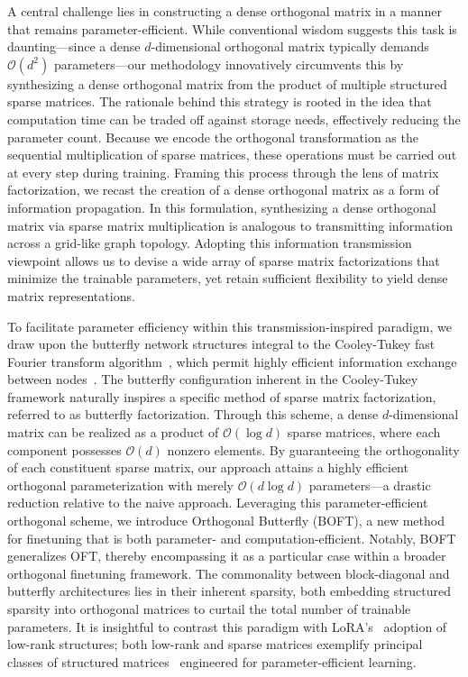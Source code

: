 A central challenge lies in constructing a dense orthogonal matrix in a manner that remains parameter-efficient. While conventional wisdom suggests this task is daunting—since a dense $d$-dimensional orthogonal matrix typically demands $\mathcal{O}(d^2)$ parameters—our methodology innovatively circumvents this by synthesizing a dense orthogonal matrix from the product of multiple structured sparse matrices. The rationale behind this strategy is rooted in the idea that computation time can be traded off against storage needs, effectively reducing the parameter count. Because we encode the orthogonal transformation as the sequential multiplication of sparse matrices, these operations must be carried out at every step during training. Framing this process through the lens of matrix factorization, we recast the creation of a dense orthogonal matrix as a form of information propagation. In this formulation, synthesizing a dense orthogonal matrix via sparse matrix multiplication is analogous to transmitting information across a grid-like graph topology. Adopting this information transmission viewpoint allows us to devise a wide array of sparse matrix factorizations that minimize the trainable parameters, yet retain sufficient flexibility to yield dense matrix representations.

To facilitate parameter efficiency within this transmission-inspired paradigm, we draw upon the butterfly network structures integral to the Cooley-Tukey fast Fourier transform algorithm~\cite{cooley1965algorithm}, which permit highly efficient information exchange between nodes~\cite{klasing1994broadcasting}. The butterfly configuration inherent in the Cooley-Tukey framework naturally inspires a specific method of sparse matrix factorization, referred to as butterfly factorization. Through this scheme, a dense $d$-dimensional matrix can be realized as a product of $\mathcal{O}(\log d)$ sparse matrices, where each component possesses $\mathcal{O}(d)$ nonzero elements. By guaranteeing the orthogonality of each constituent sparse matrix, our approach attains a highly efficient orthogonal parameterization with merely $\mathcal{O}(d\log d)$ parameters—a drastic reduction relative to the naive approach. Leveraging this parameter-efficient orthogonal scheme, we introduce Orthogonal Butterfly (BOFT), a new method for finetuning that is both parameter- and computation-efficient. Notably, BOFT generalizes OFT, thereby encompassing it as a particular case within a broader orthogonal finetuning framework. The commonality between block-diagonal and butterfly architectures lies in their inherent sparsity, both embedding structured sparsity into orthogonal matrices to curtail the total number of trainable parameters. It is insightful to contrast this paradigm with LoRA’s~\cite{hulora2022} adoption of low-rank structures; both low-rank and sparse matrices exemplify principal classes of structured matrices~\cite{candes2011robust} engineered for parameter-efficient learning.

